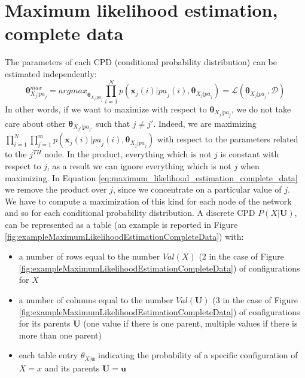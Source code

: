 \section{Maximum likelihood estimation, complete data}
The parameters of each CPD (conditional probability distribution) can be
estimated independently:
\begin{equation}
	\label{eq:maximum_likelihood_estimation_complete_data}\pmb{\theta}^{\mathit{max}}
	_{X_j | \mathit{pa}_j}= \mathit{argmax}_{\pmb{\theta}_{X_j | \mathit{pa}_j}}\prod
	_{i=1}^{N} p(\pmb{x}_{j}(i) | \mathit{pa}_{j}(i), \pmb{\theta}_{X_j |
	\mathit{pa}_j}) = \mathcal{L}(\pmb{\theta}_{X_j|\mathit{pa}_j}, \mathcal{D})
\end{equation}
In other words, if we want to maximize with respect to
$\pmb{\theta}_{X_j | \mathit{pa}_j}$, we do not take care about other $\pmb{\theta}
_{X_{j'} | \mathit{pa}_{j'}}$ such that $j \neq j'$. Indeed, we are maximizing $\prod
_{i=1}^{N} \prod_{j=1}^{m} p(\pmb{x}_{j}(i) | \mathit{pa}_{j}(i), \pmb{\theta}_{X_j
| \mathit{pa}_j})$ with respect to the parameters related to the $j^{\mathit{TH}}$
node. In the product, everything which is not $j$ is constant with respect to $j$,
as a result we can ignore everything which is not $j$ when maximizing. In Equation
\ref{eq:maximum_likelihood_estimation_complete_data} we remove the product over $j$,
since we concentrate on a particular value of $j$.\\ We have to compute a
maximization of this kind for each node of the network and so for each
conditional probability distribution. A discrete CPD $P(X|\pmb{U})$, can be
represented as a table (an example is reported in Figure \ref{fig:exampleMaximumLikelihoodEstimationCompleteData})
with:
\begin{itemize}
	\item a number of rows equal to the number $\mathit{Val}(X)$ (2 in the case of
		Figure \ref{fig:exampleMaximumLikelihoodEstimationCompleteData}) of configurations
		for $X$

	\item a number of columns equal to the number $\mathit{Val}(\pmb{U})$ (3 in
		the case of Figure \ref{fig:exampleMaximumLikelihoodEstimationCompleteData})
		of configurations for its parents $\pmb{U}$ (one value if there is one
		parent, multiple values if there is more than one parent)

	\item each table entry $\theta_{X|\pmb{u}}$ indicating the probability of a specific
		configuration of $X=x$ and its parents $\pmb{U}=\pmb{u}$
\end{itemize}

